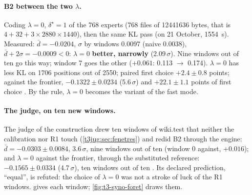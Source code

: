 \paragraph{B2 between the two $\lambda$.} Coding $\lambda = 0$, $\delta^\star = 1$ of the 768 experts (768 files of \num{12441636} bytes, that is $4 + 32 + 3 \times \num{2880} \times \num{1440}$), then the same KL pass (on 21 October, \SI{1554}{\second}). Measured: $\bar d = -\num{0.0204}$, $\sigma$ by windows \num{0.0097} (naive \num{0.0038}), $\bar d + 2\sigma = -\num{0.0009} < 0$: $\lambda = 0$ \textbf{better, narrowly} (\num{2.09}\,$\sigma$). Nine windows out of ten go this way; window 7 goes the other ($+\num{0.061}$: \num{0.113} $\to$ \num{0.174}). $\lambda = 0$ has less KL on \num{1706} positions out of \num{2550}; paired first choice $+\num{2.4} \pm \num{0.8}$ points; against the frontier, $-\num{0.1322} \pm \num{0.0234}$ (\num{5.6}\,$\sigma$) and $+\num{22.1} \pm \num{1.1}$ points of first choice \mes. By the rule, $\lambda = 0$ becomes the variant of the fast mode.

\paragraph{The judge, on ten new windows.} The judge of the construction drew ten windows of wiki.test that neither the calibration nor R1 touch (\cref{t3jug:sec:fenetres}) and redid B2 through the engine: $\bar d = -\num{0.0303} \pm \num{0.0084}$, \num{3.6}\,$\sigma$, nine windows out of ten (window 0 against, $+\num{0.016}$); and $\lambda = 0$ against the frontier, through the substituted reference: $-\num{0.1565} \pm \num{0.0334}$ (\num{4.7}\,$\sigma$), ten windows out of ten \mes. Its declared prediction, ``equal'', is refuted: the choice of $\lambda = 0$ was not a stroke of luck of the R1 windows.  gives each window; \cref{fig:t3-syno-foret} draws them.

